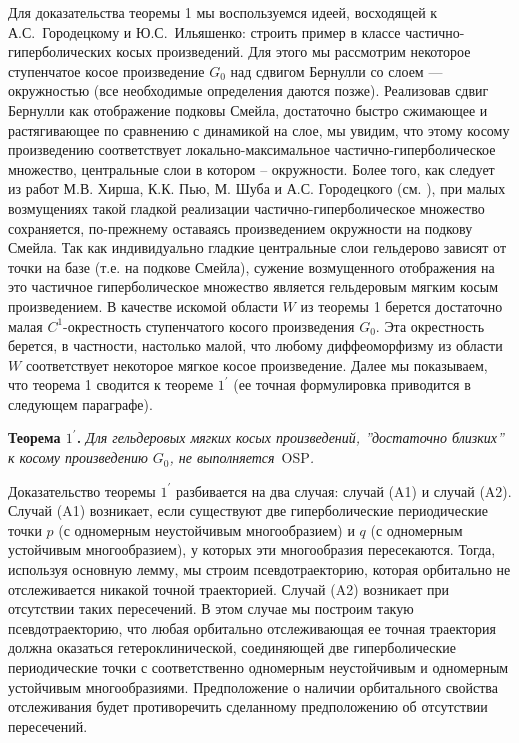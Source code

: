\documentclass[12pt]{article}
\begin{document}
Для доказательства теоремы 1 мы воспользуемся идеей, восходящей к А.С.~Городецкому и Ю.С.~Ильяшенко: строить пример в классе частично-гипербо\-лических косых произведений. Для этого мы рассмотрим некоторое ступенчатое косое произведение $G_0$ над сдвигом Бернулли со слоем --- окружностью (все необходимые определения даются позже). Реализовав сдвиг Бернулли как отображение подковы Смейла, достаточно быстро сжимающее и растягивающее по сравнению с динамикой на слое, мы увидим, что этому косому произведению соответствует локально-максимальное частич\-но-гиперболическое множество, центральные слои в котором -- окружности. Более того, как следует из работ М.В. Хирша, К.К. Пью, М. Шуба и А.С. Городецкого (см. \cite{12,13,14}), при 
малых возмущениях такой гладкой реализации частич\-но-гиперболическое множество сохраняется, по-прежнему оставаясь произведением окружности на подкову 
Смейла. Так как индивидуально гладкие центральные слои гельдерово зависят от точки на базе (т.е. на подкове Смейла), сужение возмущенного отображения на это частичное гиперболическое множество является гельдеровым мягким косым произведением. В качестве искомой области $W$ из теоремы 1 берется достаточно малая $C^1$-окрестность ступенчатого косого произведения $G_0$. Эта окрестность берется, в частности, настолько малой, что любому диффеоморфизму из области $W$ соответствует некоторое мягкое косое произведение. Далее мы показываем, что теорема 1 сводится к теореме $1^{\prime}$ (ее точная формулировка приводится в следующем параграфе).

\textbf{Теорема $\mbox{1}^{\prime}$.} \textit{Для гельдеровых мягких косых произведений, ''достаточно близких'' к косому произведению $G_0$, не выполняется}~OSP\textit{.}

Доказательство теоремы $1^{\prime}$ разбивается на два случая: случай (A1) и случай (A2). Случай (A1) возникает, если существуют две гиперболические периодические точки $p$ (с одномерным неустойчивым многообразием) и $q$ (с одномерным устойчивым многообразием), у которых эти многообразия пересекаются. Тогда, используя основную лемму, мы строим псевдотраекторию, которая орбитально не отслеживается никакой точной траекторией.
Случай (A2) возникает при отсутствии таких пересечений. В этом случае мы построим такую псевдотраекторию, что любая орбитально отслеживающая ее точная 
траектория должна оказаться гетероклинической, соединяющей две гиперболические периодические точки с соответственно одномерным неустойчивым и одномерным устойчивым многообразиями. Предположение о наличии орбитального свойства отслеживания будет противоречить сделанному предположению об отсутствии пересечений.
\end{document}
